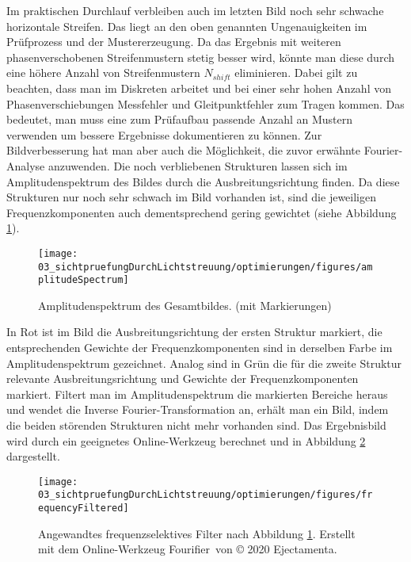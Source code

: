 \noindent
Im praktischen Durchlauf verbleiben auch im letzten Bild noch sehr schwache horizontale Streifen.
Das liegt an den oben genannten Ungenauigkeiten im Prüfprozess und der Mustererzeugung.
Da das Ergebnis mit weiteren phasenverschobenen Streifenmustern stetig besser wird, könnte man diese durch eine höhere Anzahl von Streifenmustern $N_{shift}$ eliminieren.
Dabei gilt zu beachten, dass man im Diskreten arbeitet und bei einer sehr hohen Anzahl von Phasenverschiebungen Messfehler und Gleitpunktfehler zum Tragen kommen.
Das bedeutet, man muss eine zum Prüfaufbau passende Anzahl an Mustern verwenden um bessere Ergebnisse dokumentieren zu können.
Zur Bildverbesserung hat man aber auch die Möglichkeit, die zuvor erwähnte Fourier-Analyse anzuwenden.
Die noch verbliebenen Strukturen lassen sich im Amplitudenspektrum des Bildes durch die Ausbreitungsrichtung finden.
Da diese Strukturen nur noch sehr schwach im Bild vorhanden ist, sind die jeweiligen Frequenzkomponenten auch dementsprechend gering gewichtet (siehe Abbildung \ref{img:amplitudeSpectrum}).

\begin{figure}[H]
	\centering
	\texttt{[image: 03\_sichtpruefungDurchLichtstreuung/optimierungen/figures/amplitudeSpectrum]}
	\caption[Amplitudenspektrum des Gesamtbildes]{Amplitudenspektrum des Gesamtbildes. (mit Markierungen)}
	\label{img:amplitudeSpectrum}
\end{figure}

\noindent
In Rot ist im Bild die Ausbreitungsrichtung der ersten Struktur markiert, die entsprechenden Gewichte der Frequenzkomponenten sind in derselben Farbe im Amplitudenspektrum gezeichnet.
Analog sind in Grün die für die zweite Struktur relevante Ausbreitungsrichtung und Gewichte der Frequenzkomponenten markiert.
Filtert man im Amplitudenspektrum die markierten Bereiche heraus und wendet die Inverse Fourier-Transformation an, erhält man ein Bild, indem die beiden störenden Strukturen nicht mehr vorhanden sind.
Das Ergebnisbild wird durch ein geeignetes Online-Werkzeug \cite{fourierTool} berechnet und in Abbildung \ref{img:frequencyFiltered} dargestellt.

\begin{figure}[H]
	\centering
	\texttt{[image: 03\_sichtpruefungDurchLichtstreuung/optimierungen/figures/frequencyFiltered]}
	\caption[Bild mit angewandtem frequenzselektives Filter]{Angewandtes frequenzselektives Filter nach Abbildung \ref{img:amplitudeSpectrum}. Erstellt mit dem Online-Werkzeug \glqq Fourifier\grqq ~von © 2020 Ejectamenta.\cite{fourierTool}\footnotemark}
	\label{img:frequencyFiltered}
\end{figure}
